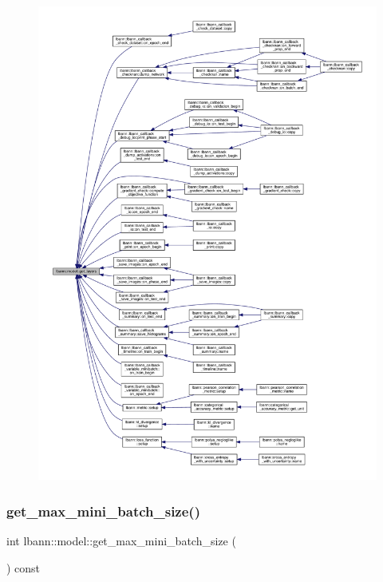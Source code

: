 \begin{figure}[H]
\begin{center}
\leavevmode
\includegraphics[width=350pt]{classlbann_1_1model_ae14f4b2cc8882b3739d4aeb25d9e73c9_icgraph}
\end{center}
\end{figure}
\mbox{\label{classlbann_1_1model_a8c311798ff4acaeafdfbf85162ba5084}} 
\subsubsection{\texorpdfstring{get\+\_\+max\+\_\+mini\+\_\+batch\+\_\+size()}{get\_max\_mini\_batch\_size()}}
{\footnotesize\ttfamily int lbann\+::model\+::get\+\_\+max\+\_\+mini\+\_\+batch\+\_\+size (\begin{DoxyParamCaption}{ }\end{DoxyParamCaption}) const\hspace{0.3cm}{\ttfamily [inline]}}


